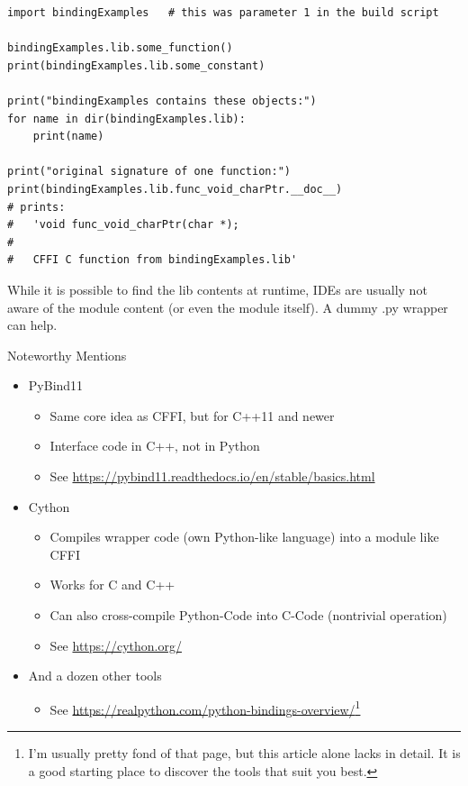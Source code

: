 \begin{frame}[fragile]
%
\begin{codebox}
\begin{verbatim}
import bindingExamples   # this was parameter 1 in the build script

bindingExamples.lib.some_function()
print(bindingExamples.lib.some_constant)

print("bindingExamples contains these objects:")
for name in dir(bindingExamples.lib):
    print(name)

print("original signature of one function:")
print(bindingExamples.lib.func_void_charPtr.__doc__)
# prints:
#   'void func_void_charPtr(char *);
#
#   CFFI C function from bindingExamples.lib'
\end{verbatim}
\end{codebox}
%
\begin{warnbox}
\footnotesize
While it is possible to find the lib contents at runtime, IDEs are usually not aware of the module content (or even the module itself). A dummy .py wrapper can help.
\end{warnbox}
%
\end{frame}


\begin{frame}{Noteworthy Mentions}
%
\begin{itemize}
\item PyBind11
	\begin{itemize}
	\item Same core idea as CFFI, but for C++11 and newer
	\item Interface code in C++, not in Python
	\item See \url{https://pybind11.readthedocs.io/en/stable/basics.html}
	\end{itemize}
\item Cython
	\begin{itemize}
	\item Compiles wrapper code (own Python-like language) into a module like CFFI
	\item Works for C and C++
	\item Can also cross-compile Python-Code into C-Code (nontrivial operation)
	\item See \url{https://cython.org/}
	\end{itemize}
\item And a dozen other tools
	\begin{itemize}
	\item See \url{https://realpython.com/python-bindings-overview/}\footnote{%
		I'm usually pretty fond of that page, but this article alone lacks in detail. It is a good starting place to discover the tools that suit you best.
	}
	\end{itemize}
\end{itemize}
%
\end{frame}

